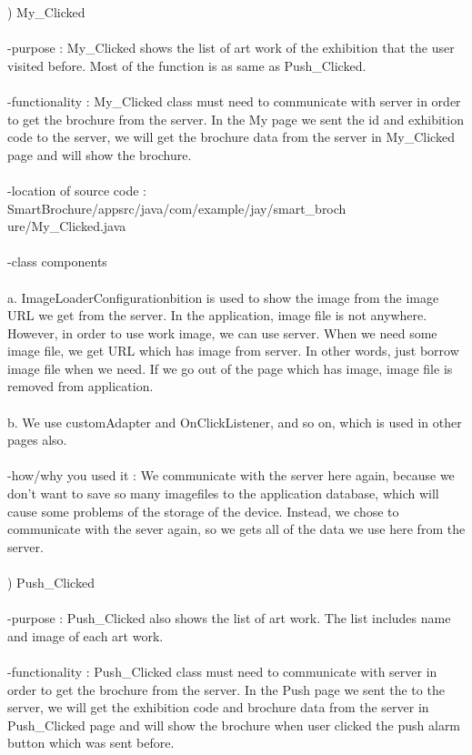 \documentclass[conference]{IEEEtran}
\begin{document}
) My\_Clicked\\\\
-purpose : My\_Clicked shows the list of art work of the exhibition that the user visited before. Most of the function is as same as Push\_Clicked.\\
\\ -functionality : My\_Clicked class must need to communicate with server in order to get the brochure from the server. In the My page we sent the id and exhibition code to the server, we will get the brochure data from the server in My\_Clicked page and will show the brochure.\\
\\ -location of source code : SmartBrochure/appsrc/java/com/example/jay/smart\_broch
ure/My\_Clicked.java\\
\\ -class components\\
\\ a. ImageLoaderConfigurationbition is used to show the image from the image URL we get from the server. In the application, image file is not anywhere. However, in order to use work image, we can use server. When we need some image file, we get URL which has image from server. In other words, just borrow image file when we need. If we go out of the page which has image, image file is removed from application.\\
\\ b. We use customAdapter and OnClickListener, and so on, which is used in other pages also.\\
\\ -how/why you used it : We communicate with the server here again, because we don’t want to save so many imagefiles to the application database, which will cause some problems of the storage of the device. Instead, we chose to communicate with the sever again, so we gets all of the data we use here from the server.\\\\
) Push\_Clicked\\\\
-purpose : Push\_Clicked also shows the list of art work. The list includes name and image of each art work.\\
\\ -functionality : Push\_Clicked class must need to communicate with server in order to get the brochure from the server. In the Push page we sent the to the server, we will get the exhibition code and brochure data from the server in Push\_Clicked page and will show the brochure when user clicked the push alarm button which was sent before.\\
\end{document}
